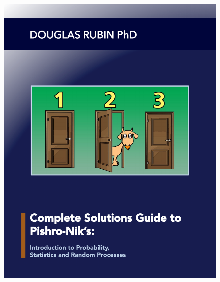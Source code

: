 \documentclass[11pt]{book}
\makeatletter
\renewcommand{\maketitle} %
{ \begingroup \vskip 10pt \begin{center} \Huge {\bf \@title}
    \vskip 10pt \large \@author \hskip 20pt \@date \end{center}
  \vskip 10pt \endgroup \setcounter{footnote}{0} }
\makeatother
\begin{document}





	\begin{figure}[h]
\centering
\vspace*{-2.54cm}  
\hspace*{-2.63cm}  
     \includegraphics[totalheight=11in]{book_cover/book_cover.pdf}
	\end{figure}
\end{document}
